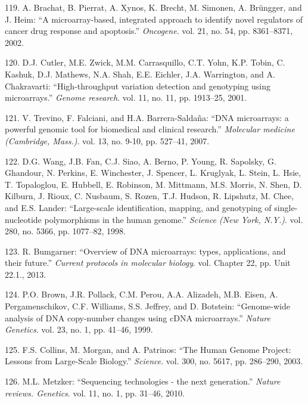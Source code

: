 \documentclass[12pt,a4paper,twoside]{ugathesis}
\theoremstyle{definition}
\theoremstyle{definition}
\theoremstyle{definition}
\theoremstyle{remark}
\begin{document}
\hypertarget{ref-Brachat2002}{}
119. A. Brachat, B. Pierrat, A. Xynos, K. Brecht, M. Simonen, A.
Brüngger, and J. Heim: ``A microarray-based, integrated approach to
identify novel regulators of cancer drug response and apoptosis.''
\emph{Oncogene}. vol. 21, no. 54, pp. 8361--8371, 2002.

\hypertarget{ref-Cutler2001}{}
120. D.J. Cutler, M.E. Zwick, M.M. Carrasquillo, C.T. Yohn, K.P. Tobin,
C. Kashuk, D.J. Mathews, N.A. Shah, E.E. Eichler, J.A. Warrington, and
A. Chakravarti: ``High-throughput variation detection and genotyping
using microarrays.'' \emph{Genome research}. vol. 11, no. 11, pp.
1913--25, 2001.

\hypertarget{ref-Trevino2007}{}
121. V. Trevino, F. Falciani, and H.A. Barrera-Saldaña: ``DNA
microarrays: a powerful genomic tool for biomedical and clinical
research.'' \emph{Molecular medicine (Cambridge, Mass.)}. vol. 13, no.
9-10, pp. 527--41, 2007.

\hypertarget{ref-Wang1998}{}
122. D.G. Wang, J.B. Fan, C.J. Siao, A. Berno, P. Young, R. Sapolsky, G.
Ghandour, N. Perkins, E. Winchester, J. Spencer, L. Kruglyak, L. Stein,
L. Hsie, T. Topaloglou, E. Hubbell, E. Robinson, M. Mittmann, M.S.
Morris, N. Shen, D. Kilburn, J. Rioux, C. Nusbaum, S. Rozen, T.J.
Hudson, R. Lipshutz, M. Chee, and E.S. Lander: ``Large-scale
identification, mapping, and genotyping of single-nucleotide
polymorphisms in the human genome.'' \emph{Science (New York, N.Y.)}.
vol. 280, no. 5366, pp. 1077--82, 1998.

\hypertarget{ref-Bumgarner2013}{}
123. R. Bumgarner: ``Overview of DNA microarrays: types, applications,
and their future.'' \emph{Current protocols in molecular biology}. vol.
Chapter 22, pp. Unit 22.1., 2013.

\hypertarget{ref-Brown1999}{}
124. P.O. Brown, J.R. Pollack, C.M. Perou, A.A. Alizadeh, M.B. Eisen, A.
Pergamenschikov, C.F. Williams, S.S. Jeffrey, and D. Botstein:
``Genome-wide analysis of DNA copy-number changes using cDNA
microarrays.'' \emph{Nature Genetics}. vol. 23, no. 1, pp. 41--46, 1999.

\hypertarget{ref-Collins2003}{}
125. F.S. Collins, M. Morgan, and A. Patrinos: ``The Human Genome
Project: Lessons from Large-Scale Biology.'' \emph{Science}. vol. 300,
no. 5617, pp. 286--290, 2003.

\hypertarget{ref-Metzker2010}{}
126. M.L. Metzker: ``Sequencing technologies - the next generation.''
\emph{Nature reviews. Genetics}. vol. 11, no. 1, pp. 31--46, 2010.
\end{document}
